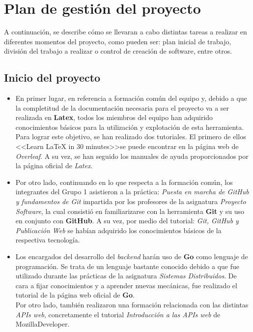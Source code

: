 \documentclass[11pt, a4paper, titlepage]{article}
\begin{document}
\section{Plan de gestión del proyecto}

A continuación, se describe cómo se llevaran a cabo distintas tareas a realizar en diferentes momentos del proyecto, como pueden ser: plan inicial de trabajo, división del trabajo a realizar o control de creación de software, entre otros.

\subsection{Inicio del proyecto}

\begin{itemize}

\item En primer lugar, en referencia a formación común del equipo y, debido a que la completitud de la documentación necesaria para el proyecto va a ser realizada en \textbf{Latex}, todos los miembros del equipo han adquirido conocimientos básicos para la utilización y explotación de esta herramienta. Para lograr este objetivo, se han realizado dos tutoriales. El primero de ellos <<Learn LaTeX in 30 minutes>>\cite{latextutorial1}se puede encontrar en la página web de \textit{Overleaf}. A su vez, se han seguido los manuales de ayuda proporcionados por la página oficial de \textit{Latex}\cite{latextutorial2}. 

\item Por otro lado, continuando en lo que respecta a la formación común, los integrantes del Grupo 1 asistieron a la práctica: \textit{Puesta en marcha de GitHub y fundamentos de Git} impartida por los profesores de la asignatura \textit{Proyecto Software}, la cual consistió en familiarizarse con la herramienta \textbf{Git} y su uso en conjunto con \textbf{GitHub}. A su vez, por medio del tutorial: \textit{Git, GitHub y Publicación Web}\cite{githubtutorial} se habían adquirido los conocimientos básicos de la respectiva tecnología.

\item Los encargados del desarrollo del \textit{backend} harán uso de \textbf{Go} como lenguaje de programación. Se trata de un lenguaje bastante conocido debido a que fue utilizado durante las prácticas de la asignatura \textit{Sistemas Distribuidos}. De cara a fijar conocimientos y a aprender nuevas mecánicas, fue realizado el tutorial de la página web oficial de \textbf{Go}. \\
Por otro lado, también realizaron una formación relacionada con las distintas \textit{APIs web}, concretamente el tutorial \textit{Introducción a las APIs web} de MozillaDeveloper\cite{apisweb}.


\end{itemize}
\end{document}
